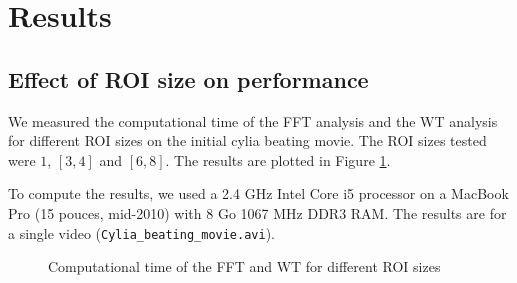 \documentclass[11pt]{scrartcl}
\begin{document}
\section{Results}

\subsection{Effect of ROI size on performance}
\label{sec:effect-roi-size}

We measured the computational time of the FFT analysis and the WT analysis for different ROI sizes on the
initial cylia beating movie. The ROI sizes tested were $1$, $[3, 4]$ and $[6, 8]$. The results are plotted in
Figure \ref{fig:computational-time}.

To compute the results, we used a 2.4 GHz Intel Core i5 processor on a MacBook Pro (15 pouces, mid-2010) with
8 Go 1067 MHz DDR3 RAM. The results are for a single video (\texttt{Cylia\_beating\_movie.avi}).

\speed
\begin{figure}[ht]
  \begin{minipage}{0.4\linewidth}
    \centering
    \pgfplotstabletypeset[columns={FFT,WT}]\speed
    
  \end{minipage}
  \begin{minipage}{0.6\linewidth}
    \centering
  \end{minipage}
  \caption{Computational time of the FFT and WT for different ROI sizes}
  \label{fig:computational-time}
\end{figure}
\end{document}
